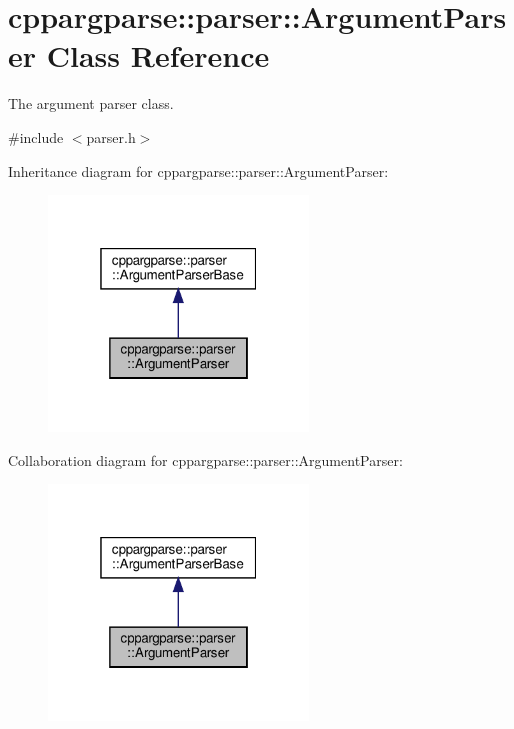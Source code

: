 \hypertarget{classcppargparse_1_1parser_1_1ArgumentParser}{}\section{cppargparse\+:\+:parser\+:\+:Argument\+Parser Class Reference}
\label{classcppargparse_1_1parser_1_1ArgumentParser}


The argument parser class.  




{\ttfamily \#include $<$parser.\+h$>$}



Inheritance diagram for cppargparse\+:\+:parser\+:\+:Argument\+Parser\+:\nopagebreak
\begin{figure}[H]
\begin{center}
\leavevmode
\includegraphics[width=196pt]{classcppargparse_1_1parser_1_1ArgumentParser__inherit__graph}
\end{center}
\end{figure}


Collaboration diagram for cppargparse\+:\+:parser\+:\+:Argument\+Parser\+:\nopagebreak
\begin{figure}[H]
\begin{center}
\leavevmode
\includegraphics[width=196pt]{classcppargparse_1_1parser_1_1ArgumentParser__coll__graph}
\end{center}
\end{figure}
